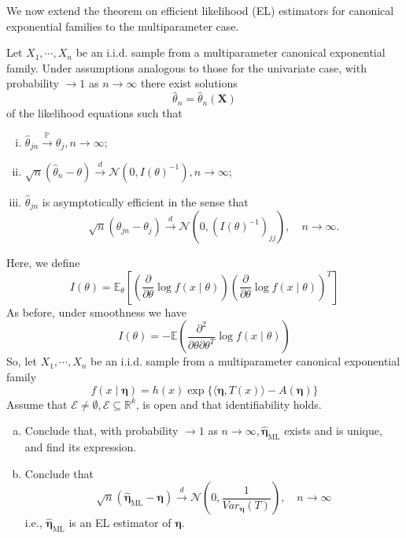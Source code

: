 \begin{ex}
    We now extend the theorem on efficient likelihood (EL) estimators for canonical exponential families to the multiparameter case. 

    Let \(X_{1}, \cdots, X_{n}\) be an i.i.d. sample from a multiparameter canonical exponential family. Under assumptions analogous to those for the univariate case, with probability \(\rightarrow 1\) as \(n \rightarrow \infty\) there exist solutions
    \[
        \widehat{\theta}_{n}=\hat{\theta}_{n}(\mathbf{X})
    \]
    of the likelihood equations such that 
    \begin{enumerate}[(i)]
        \item \(\hat{\theta}_{j n} \stackrel{\mathbb{P}}{\rightarrow} \theta_{j}, n \rightarrow \infty\); 
        \item \(\sqrt{n}\left(\widehat{\theta}_{n}-\theta\right) \stackrel{d}{\rightarrow} \mathcal{N}\left(0, I(\theta)^{-1}\right), n \rightarrow \infty\); 
        \item \(\widehat{\theta}_{j n}\) is asymptotically efficient in the sense that
        \[
            \sqrt{n}\left(\hat{\theta}_{j n}-\theta_{j}\right) \stackrel{d}{\rightarrow} \mathcal{N}\left(0,\left(I(\theta)^{-1}\right)_{j j}\right), \quad n \rightarrow \infty. 
        \]
    \end{enumerate}
    Here, we define
    \[
        I(\theta)=\mathbb{E}_{\theta}\left[\left(\frac{\partial}{\partial \theta} \log f(x \mid \theta)\right)\left(\frac{\partial}{\partial \theta} \log f(x \mid \theta)\right)^T\right]
    \]
    As before, under smoothness we have
    \[
        I(\theta)=-\mathbb{E}\left(\frac{\partial^{2}}{\partial \theta \partial \theta^T} \log f(x \mid \theta)\right)
    \]
    So, let \(X_{1}, \cdots, X_{n}\) be an i.i.d. sample from a multiparameter canonical exponential family
    \[
        f(x \mid \boldsymbol{\eta})=h(x) \exp \{\langle\boldsymbol{\eta}, T(x)\rangle-A(\boldsymbol{\eta})\}
    \]
    Assume that \(\mathcal{E} \neq \emptyset, \mathcal{E} \subseteq \mathbb{R}^{k}\), is open and that identifiability holds. 
    \begin{enumerate}[(a)]
        \item Conclude that, with probability \(\rightarrow 1\) as \(n \rightarrow \infty, \widehat{\boldsymbol{\eta}}_{\mathrm{ML}}\) exists and is unique, and find its expression. 
        \item Conclude that
        \[
            \sqrt{n}\left(\widehat{\boldsymbol{\eta}}_{\mathrm{ML}}-\boldsymbol{\eta}\right) \stackrel{d}{\rightarrow} \mathcal{N}\left(0, \frac{1}{Var_{\boldsymbol{\eta}}(T)}\right), \quad n \rightarrow \infty
        \]
        i.e., \(\widehat{\boldsymbol{\eta}}_{\mathrm{ML}}\) is an EL estimator of \(\boldsymbol{\eta}\).
    \end{enumerate}
\end{ex}

